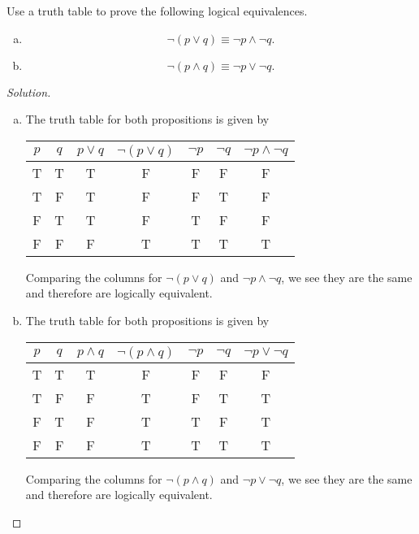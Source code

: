 \documentclass[12pt]{amsart}
\begin{document}
\begin{thm}[20 Points]\label{ex9}
  Use a truth table to prove the following logical equivalences.
  \begin{enumerate}[(a)]
  \item
    $$\neg\left(p \vee q\right) \equiv \neg p \wedge \neg q.$$
  \item
    $$\neg\left(p \wedge q \right) \equiv \neg p \vee \neg q.$$
  \end{enumerate}
  
  \begin{proof}[Solution]
    \begin{enumerate}[(a)]
    \item
      The truth table for both propositions is given by
      \begin{center}
        \begin{tabular}{c|c|c|c|c|c|c}
          $p$ & $q$ & $p \vee q$ & $\neg(p \vee q)$ & $\neg p$ & $\neg q$ & $\neg p \wedge \neg q$\\
          \hline
          T & T & T & F & F & F & F\\
          T & F & T & F & F & T & F\\
          F & T & T & F & T & F & F\\
          F & F & F & T & T & T & T
        \end{tabular}
      \end{center}
      Comparing the columns for $\neg\left(p \vee q\right)$ and $\neg p \wedge \neg q$, we see they are the same and therefore are logically equivalent.
    \item
      The truth table for both propositions is given by
      \begin{center}
        \begin{tabular}{c|c|c|c|c|c|c}
          $p$ & $q$ & $p \wedge q$ & $\neg(p \wedge q)$ & $\neg p$ & $\neg q$ & $\neg p \vee \neg q$\\
          \hline
          T & T & T & F & F & F & F\\
          T & F & F & T & F & T & T\\
          F & T & F & T & T & F & T\\
          F & F & F & T & T & T & T
        \end{tabular}
      \end{center}
      Comparing the columns for $\neg\left(p \wedge q\right)$ and $\neg p \vee \neg q$, we see they are the same and therefore are logically equivalent.
    \end{enumerate}
  \end{proof}
\end{thm}

\newpage

\end{document}
